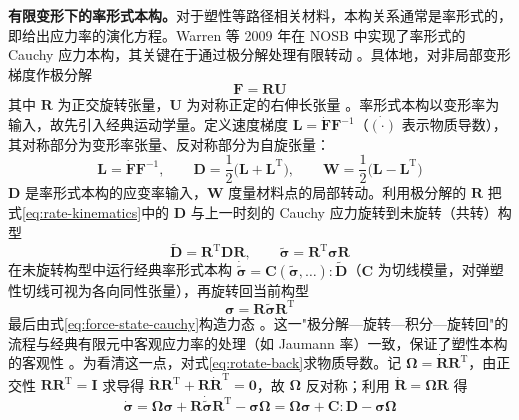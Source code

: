 \textbf{有限变形下的率形式本构。}对于塑性等路径相关材料，本构关系通常是率形式的，即给出应力率的演化方程。Warren 等 2009 年在 NOSB 中实现了率形式的 Cauchy 应力本构，其关键在于通过极分解处理有限转动 \cite{Warren2009}。具体地，对非局部变形梯度作极分解
\begin{equation}
  \mathbf{F}=\mathbf{R}\mathbf{U}
  \label{eq:polar-decomposition}
\end{equation}
其中 $\mathbf{R}$ 为正交旋转张量，$\mathbf{U}$ 为对称正定的右伸长张量 \cite{Warren2009,FlanaganTaylor1987}。率形式本构以变形率为输入，故先引入经典运动学量。定义速度梯度 $\mathbf{L}=\dot{\mathbf{F}}\mathbf{F}^{-1}$（$\dot{(\cdot)}$ 表示物质导数），其对称部分为变形率张量、反对称部分为自旋张量：
\begin{equation}
  \mathbf{L}=\dot{\mathbf{F}}\mathbf{F}^{-1},\qquad
  \mathbf{D}=\frac{1}{2}\bigl(\mathbf{L}+\mathbf{L}^{\mathrm{T}}\bigr),\qquad
  \mathbf{W}=\frac{1}{2}\bigl(\mathbf{L}-\mathbf{L}^{\mathrm{T}}\bigr)
  \label{eq:rate-kinematics}
\end{equation}
$\mathbf{D}$ 是率形式本构的应变率输入，$\mathbf{W}$ 度量材料点的局部转动。利用极分解的 $\mathbf{R}$ 把式\eqref{eq:rate-kinematics}中的 $\mathbf{D}$ 与上一时刻的 Cauchy 应力旋转到未旋转（共转）构型
\begin{equation}
  \tilde{\mathbf{D}}=\mathbf{R}^{\mathrm{T}}\mathbf{D}\mathbf{R},\qquad
  \tilde{\boldsymbol{\sigma}}=\mathbf{R}^{\mathrm{T}}\boldsymbol{\sigma}\mathbf{R}
  \label{eq:unrotated-frame}
\end{equation}
在未旋转构型中运行经典率形式本构 $\dot{\tilde{\boldsymbol{\sigma}}}=\mathbf{C}(\tilde{\boldsymbol{\sigma}},\ldots):\tilde{\mathbf{D}}$（$\mathbf{C}$ 为切线模量，对弹塑性切线可视为各向同性张量），再旋转回当前构型
\begin{equation}
  \boldsymbol{\sigma}=\mathbf{R}\tilde{\boldsymbol{\sigma}}\mathbf{R}^{\mathrm{T}}
  \label{eq:rotate-back}
\end{equation}
最后由式\eqref{eq:force-state-cauchy}构造力态 \cite{Warren2009}。这一"极分解—旋转—积分—旋转回"的流程与经典有限元中客观应力率的处理（如 Jaumann 率）一致，保证了塑性本构的客观性 \cite{FlanaganTaylor1987}。为看清这一点，对式\eqref{eq:rotate-back}求物质导数。记 $\boldsymbol{\Omega}=\dot{\mathbf{R}}\mathbf{R}^{\mathrm{T}}$，由正交性 $\mathbf{R}\mathbf{R}^{\mathrm{T}}=\mathbf{I}$ 求导得 $\dot{\mathbf{R}}\mathbf{R}^{\mathrm{T}}+\mathbf{R}\dot{\mathbf{R}}^{\mathrm{T}}=\mathbf{0}$，故 $\boldsymbol{\Omega}$ 反对称；利用 $\dot{\mathbf{R}}=\boldsymbol{\Omega}\mathbf{R}$ 得
\begin{equation}
  \dot{\boldsymbol{\sigma}}
  =\boldsymbol{\Omega}\boldsymbol{\sigma}+\mathbf{R}\dot{\tilde{\boldsymbol{\sigma}}}\mathbf{R}^{\mathrm{T}}-\boldsymbol{\sigma}\boldsymbol{\Omega}
  =\boldsymbol{\Omega}\boldsymbol{\sigma}+\mathbf{C}:\mathbf{D}-\boldsymbol{\sigma}\boldsymbol{\Omega}
  \label{eq:objective-rate}
\end{equation}
